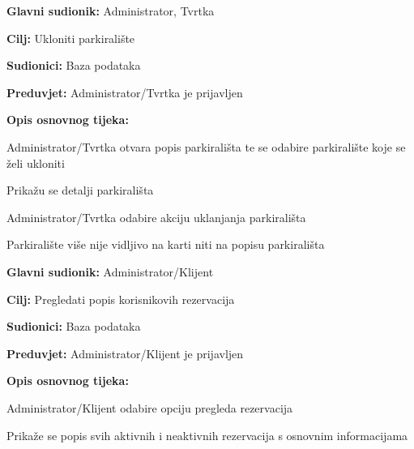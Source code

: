 \noindent {}
\begin{packed_item}
	
	\item \textbf{Glavni sudionik:} Administrator, Tvrtka
	\item \textbf{Cilj:} Ukloniti parkiralište
	\item \textbf{Sudionici:} Baza podataka
	\item \textbf{Preduvjet:} Administrator/Tvrtka je prijavljen
	\item \textbf{Opis osnovnog tijeka:}
	
	\item[] \begin{packed_enum}
		
		\item Administrator/Tvrtka otvara popis parkirališta te se odabire parkiralište koje se želi ukloniti
		\item Prikažu se detalji parkirališta
		\item Administrator/Tvrtka odabire akciju uklanjanja parkirališta
		\item Parkiralište više nije vidljivo na karti niti na popisu parkirališta

	\end{packed_enum}
\end{packed_item}

\noindent {}
\begin{packed_item}
	
	\item \textbf{Glavni sudionik: } Administrator/Klijent
	\item \textbf{Cilj:} Pregledati popis korisnikovih rezervacija
	\item \textbf{Sudionici:} Baza podataka
	\item \textbf{Preduvjet:} Administrator/Klijent je prijavljen
	\item \textbf{Opis osnovnog tijeka:}
	
	\item[] \begin{packed_enum}
		
		\item Administrator/Klijent odabire opciju pregleda rezervacija
		\item Prikaže se popis svih aktivnih i neaktivnih rezervacija s osnovnim informacijama

	\end{packed_enum}
\end{packed_item}

